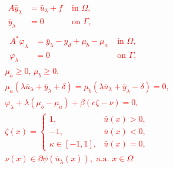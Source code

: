 \documentclass[11pt,a4paper]{amsart}
\newcommand{\om}{\Omega}
\newcommand{\ga}{\Gamma}
\begin{document}
\textcolor{red}{
\begin{subequations}
\begin{align}
&\begin{array}{rlr}
	A\bar y_\lambda & = \bar u_\lambda +f & \text{ in } \om, \\
      \bar y_\lambda &= 0 & \text{ on } \ga, 
\end{array}\\
%
&\,\begin{array}{rlr}
	A^*\varphi_\lambda & = \bar y_\lambda -y_d + \mu_b-\mu_a& \text{ in } \om, \\
      \varphi_\lambda &= 0 & \text{ on } \ga ,
\end{array}\\
&\mu_a\ge 0, \,\mu_b\ge 0, \\
&\mu_a(\lambda \bar{u}_\lambda+\bar{y}_\lambda+\delta)=\mu_b(\lambda \bar{u}_\lambda+\bar{y}_\lambda-\delta)=0, \label{eq:os_reg_compl}\\
& \varphi_\lambda  + \lambda(\mu_b-\mu_a) +\beta( c\zeta-\nu) = 0, \label{eq:os_reg_grad} \\
&\zeta(x)=\begin{cases}
    1,& \bar u(x)>0,\\
    -1, & \bar u(x)<0,\\
    \kappa \in [-1,1], &\bar u(x)=0,
\end{cases}\\
&\nu(x)\in \partial \psi(\bar u_{\lambda}(x)), \mbox{ a.a. }x\in \om
%
\end{align}
\end{subequations}
}




\end{document}
